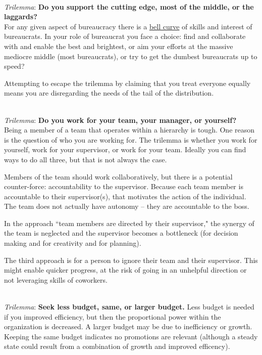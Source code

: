 \ \\

\textit{Trilemma}: \textbf{Do you support the cutting edge, most of the middle, or the laggards?}\\
For any given aspect of bureaucracy there is a \href{https://en.wikipedia.org/wiki/Normal_distribution}{bell curve} of skills and interest of bureaucrats. In your role of bureaucrat you face a choice: find and collaborate with and enable the best and brightest, or aim your efforts at the massive mediocre middle (most bureaucrats), or try to get the dumbest bureaucrats up to speed? 

Attempting to escape the trilemma by claiming that you treat everyone equally means you are disregarding the needs of the tail of the distribution. 

\ \\

\textit{Trilemma}: \textbf{Do you work for your team, your manager, or yourself?} \\
Being a member of a team that operates within a hierarchy is tough. One reason is the question of who you are working for. The trilemma is whether you work for yourself, work for your supervisor, or work for your team.  Ideally you can find ways to do all three, but that is not always the case. 

Members of the team should work collaboratively, but there is a potential counter-force: accountability to the supervisor. Because each team member is accountable to their supervisor(s), that motivates the action of the individual. The team does not actually have autonomy -- they are accountable to the boss.

In the approach ``team members are directed by their supervisor," the synergy of the team is neglected and the supervisor becomes a bottleneck (for decision making and for creativity and for planning).

The third approach is for a person to ignore their team and their supervisor. This might enable quicker progress, at the risk of going in an unhelpful direction or not leveraging skills of coworkers. 

\ \\

\textit{Trilemma}:
\textbf{Seek less budget, same, or larger budget.} Less budget is needed if you improved efficiency, but then the proportional power within the organization is decreased. A larger budget may be due to inefficiency or growth. Keeping the same budget indicates no promotions are relevant (although a steady state could result from a combination of growth and improved efficency). 

